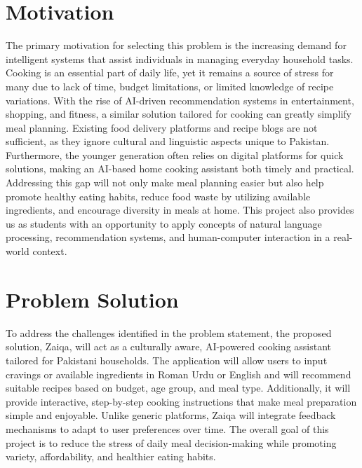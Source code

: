 \section{Motivation}

The primary motivation for selecting this problem is the increasing demand for intelligent systems that assist individuals in managing everyday household tasks. Cooking is an essential part of daily life, yet it remains a source of stress for many due to lack of time, budget limitations, or limited knowledge of recipe variations. With the rise of AI-driven recommendation systems in entertainment, shopping, and fitness, a similar solution tailored for cooking can greatly simplify meal planning. Existing food delivery platforms and recipe blogs are not sufficient, as they ignore cultural and linguistic aspects unique to Pakistan. Furthermore, the younger generation often relies on digital platforms for quick solutions, making an AI-based home cooking assistant both timely and practical. Addressing this gap will not only make meal planning easier but also help promote healthy eating habits, reduce food waste by utilizing available ingredients, and encourage diversity in meals at home. This project also provides us as students with an opportunity to apply concepts of natural language processing, recommendation systems, and human-computer interaction in a real-world context.

\section{Problem Solution}

To address the challenges identified in the problem statement, the proposed solution, Zaiqa, will act as a culturally aware, AI-powered cooking assistant tailored for Pakistani households. The application will allow users to input cravings or available ingredients in Roman Urdu or English and will recommend suitable recipes based on budget, age group, and meal type. Additionally, it will provide interactive, step-by-step cooking instructions that make meal preparation simple and enjoyable. Unlike generic platforms, Zaiqa will integrate feedback mechanisms to adapt to user preferences over time. The overall goal of this project is to reduce the stress of daily meal decision-making while promoting variety, affordability, and healthier eating habits.  

